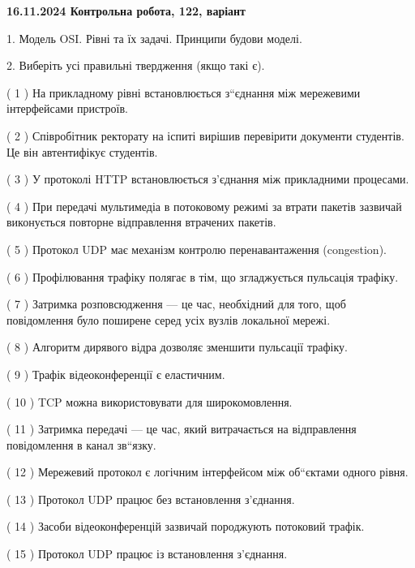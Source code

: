 \documentclass[12pt, ukrainian]{article}
\begin{document}
\vspace{4mm}
\newpage
\begin {large}

\textbf{16.11.2024 Контрольна робота, 122, варіант  }\par


{
1. Модель OSI. Рівні та їх задачі. Принципи будови моделі.



\vspace{5mm}
2. Виберіть усі правильні твердження (якщо такі є).\par
\vspace{2mm}

( 1 ) На прикладному рівні встановлюється з“єднання між мережевими інтерфейсами пристроїв.

( 2 ) Співробітник ректорату на іспиті вирішив перевірити документи студентів. Це він автентифікує студентів.

( 3 ) У протоколі HTTP встановлюється з'єднання між прикладними процесами.

( 4 ) При передачі мультимедіа в потоковому режимі за втрати пакетів зазвичай виконується повторне відправлення втрачених пакетів.

( 5 ) Протокол UDP має механізм контролю перенавантаження (congestion).

( 6 ) Профілювання трафіку полягає в тім, що згладжується пульсація трафіку.

( 7 ) Затримка розповсюдження — це час, необхідний для того, щоб повідомлення було поширене серед усіх вузлів локальної мережі.

( 8 ) Алгоритм дирявого відра дозволяє зменшити пульсації трафіку.

( 9 ) Трафік відеоконференції є еластичним.

( 10 ) TCP можна використовувати для широкомовлення.

( 11 ) Затримка передачі — це час, який витрачається на відправлення повідомлення в канал зв“язку.

( 12 ) Мережевий протокол є логічним інтерфейсом між об“єктами одного рівня.

( 13 ) Протокол UDP працює без встановлення з'єднання.

( 14 ) Засоби відеоконференцій зазвичай породжують потоковий трафік.

( 15 ) Протокол UDP працює із встановлення з'єднання.
}
\end {large}
\end{document}
